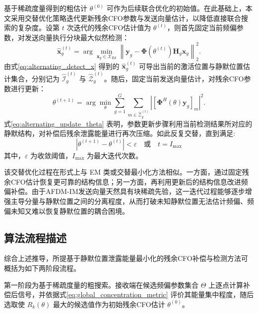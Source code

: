 基于稀疏度量得到的粗估计 $\theta^{(0)}$ 可作为后续联合优化的初始值。在此基础上，本文采用交替优化策略迭代更新残余CFO参数与发送向量估计，以降低直接联合搜索的复杂度。设第 $t$ 次迭代的残余CFO估计值为 $\theta^{(t)}$，则首先固定当前频偏参数，对发送向量执行分块最大似然检测：
\begin{equation}
    \hat{\mathbf{x}}_g^{(t)}
    =
    \arg\min_{\mathbf{x}_g\in\mathcal{X}_{\mathrm{IM}}}
    \left\|\mathbf{y}_g-\boldsymbol{\Phi}(\theta^{(t)})\mathbf{H}_g\mathbf{x}_g\right\|_2^2.
    \label{eq:alternating_detect_x}
\end{equation}
由式\ref{eq:alternating_detect_x} 得到的 $\hat{\mathbf{x}}_g^{(t)}$ 可导出当前的激活位置与静默位置估计集合，分别记为 $\hat{\mathcal{I}}_g^{(t)}$ 与 $\hat{\mathcal{Z}}_g^{(t)}$。随后，固定当前发送向量估计，对残余CFO参数进行更新：
\begin{equation}
    \theta^{(t+1)}
    =
    \arg\min_{\theta}
    \sum_{g=1}^{G}
    \sum_{m\in\hat{\mathcal{Z}}_g^{(t)}}
    \left|\left[\boldsymbol{\Phi}^{H}(\theta)\mathbf{y}_g\right]_m\right|^2.
    \label{eq:alternating_update_theta}
\end{equation}
式\ref{eq:alternating_update_theta} 表明，参数更新步骤利用当前检测结果所对应的静默结构，对补偿后残余泄露能量进行再次压缩。如此反复交替，直到满足:
\begin{equation}
    \left|\theta^{(t+1)}-\theta^{(t)}\right|<\varepsilon
    \quad\text{或}\quad
    t=I_{\max}
    \label{eq:alternating_stop}
\end{equation}
其中，$\varepsilon$ 为收敛阈值，$I_{\max}$ 为最大迭代次数。

该交替优化过程在形式上与 EM 类或交替最小化方法相似。一方面，通过固定残余CFO估计恢复更可靠的结构信息；另一方面，再利用更新后的结构信息改进频偏补偿。由于AFDM-IM发送向量天然具有块稀疏先验，这一迭代过程能够逐步增强主导分量与静默位置之间的分离程度，从而打破未知静默位置无法估计频偏、频偏未知又难以恢复静默位置的耦合困境。

\subsection{算法流程描述}
\label{subsec:algorithm_description}

综合上述推导，所提基于静默位置泄露能量最小化的残余CFO补偿与检测方法可概括为如下两阶段流程。

第一阶段为基于稀疏度量的粗搜索。接收端在候选频偏参数集合 $\Theta$ 上逐点计算补偿后信号，并依据式\ref{eq:global_concentration_metric} 评价其能量集中程度，随后选取使 $R_k(\theta)$ 最大的候选值作为初始残余CFO估计 $\theta^{(0)}$。

